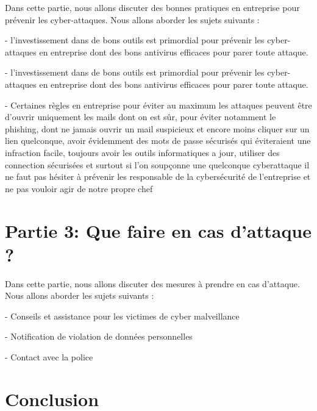 \documentclass[a4paper,11pt]{article}
\begin{document}
Dans cette partie, nous allons discuter des bonnes pratiques en entreprise pour prévenir les cyber-attaques. Nous allons aborder les sujets suivants :

  - l’investissement dans de bons outils est primordial pour prévenir les cyber-attaques en entreprise dont des bons antivirus efficaces pour parer toute attaque.

  - l’investissement dans de bons outils est primordial pour prévenir les cyber-attaques en entreprise dont des bons antivirus efficaces pour parer toute attaque.

  - Certaines règles en entreprise pour éviter au maximum les attaques peuvent être d’ouvrir uniquement les mails dont on est sûr, pour éviter notamment le phishing, dont ne jamais ouvrir un mail suspicieux et encore moins cliquer sur un lien quelconque, avoir évidemment des mots de passe sécurisés qui éviteraient une infraction facile, toujours avoir les outils informatiques a jour, utiliser des connection sécurisées et surtout si l’on soupçonne une quelconque cyberattaque il ne faut pas hésiter à prévenir les responsable de la cybersécurité de l’entreprise et ne pas vouloir agir de notre propre chef


\section{Partie 3: Que faire en cas d’attaque ?}

Dans cette partie, nous allons discuter des mesures à prendre en cas d’attaque. Nous allons aborder les sujets suivants :

  - Conseils et assistance pour les victimes de cyber malveillance

  - Notification de violation de données personnelles

  - Contact avec la police


\section{Conclusion}




\end{document}
